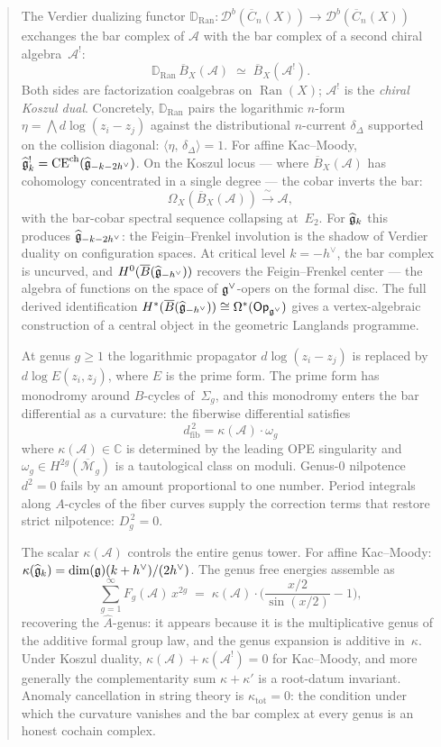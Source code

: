 \documentclass[11pt]{memoir}
\DeclareMathOperator{\Ran}{Ran}
\newcommand{\cat}[1]{\mathsf{#1}}
\newcommand{\Op}{\cat{Op}}
\newcommand{\cA}{\mathcal{A}}
\newcommand{\barB}{\overline{B}}
\newcommand{\dfib}{d_{\mathrm{fib}}}                  %
\newcommand{\Dg}[1]{D_{#1}}                           %
\begin{document}
\begin{abstract}
\medskip
The Verdier dualizing functor
$\mathbb{D}_{\Ran}\colon
\mathcal{D}^b(\overline{C}_n(X)) \to
\mathcal{D}^b(\overline{C}_n(X))$
exchanges the bar complex of $\cA$ with the bar complex of a second
chiral algebra~$\cA^!$:
\[
\mathbb{D}_{\Ran}\,\barB_X(\cA)
\;\simeq\; \barB_X(\cA^!).
\]
Both sides are factorization coalgebras on $\operatorname{Ran}(X)$;
$\cA^!$ is the \emph{chiral Koszul dual}.
Concretely, $\mathbb{D}_{\Ran}$ pairs the logarithmic $n$-form
$\eta = \bigwedge d\log(z_i - z_j)$ against the distributional
$n$-current $\delta_\Delta$ supported on the collision diagonal:
$\langle \eta,\, \delta_\Delta \rangle = 1$.
For affine Kac--Moody, $\widehat{\fg}_k^! =
\mathrm{CE}^{\mathrm{ch}}(\widehat{\fg}_{-k-2h^\vee})$.  On
the Koszul locus --- where $\barB_X(\cA)$ has cohomology concentrated
in a single degree --- the cobar inverts the bar:
\[
\Omega_X(\barB_X(\cA)) \xrightarrow{\;\sim\;} \cA,
\]
with the bar-cobar spectral sequence collapsing at~$E_2$.  For
$\widehat{\fg}_k$ this produces
$\widehat{\fg}_{-k-2h^\vee}$: the Feigin--Frenkel involution is the
shadow of Verdier duality on configuration spaces.  At critical level
$k = -h^\vee$, the bar complex is uncurved, and
$H^0(\barB(\widehat{\fg}_{-h^\vee}))$ recovers the Feigin--Frenkel
center --- the algebra of functions on the space of
$\fg^\vee$-opers on the formal disc.  The full derived identification
$H^*(\barB(\widehat{\fg}_{-h^\vee})) \cong \Omega^*(\Op_{\fg^\vee})$
gives a vertex-algebraic construction of a central object in the
geometric Langlands programme.

\medskip
At genus $g \geq 1$ the logarithmic propagator $d\log(z_i - z_j)$ is
replaced by $d\log E(z_i, z_j)$, where $E$ is the prime form.  The
prime form has monodromy around $B$-cycles of~$\Sigma_g$, and this
monodromy enters the bar differential as a curvature: the fiberwise
differential satisfies
\[
\dfib^{\,2} = \kappa(\cA) \cdot \omega_g
\]
where $\kappa(\cA) \in \mathbb{C}$ is determined by the leading OPE
singularity and $\omega_g \in H^{2g}(\overline{\mathcal{M}}_g)$ is a
tautological class on moduli.  Genus-$0$ nilpotence $d^2 = 0$ fails by
an amount proportional to one number.  Period integrals along $A$-cycles
of the fiber curves supply the correction terms that restore strict
nilpotence:
$\Dg{g}^{\,2} = 0$.

The scalar $\kappa(\cA)$ controls the entire genus tower.
For affine Kac--Moody:
$\kappa(\widehat{\fg}_k) = \dim(\fg)(k + h^\vee)/(2h^\vee)$.
The genus free energies assemble as
\[
\sum_{g=1}^{\infty} F_g(\cA)\, x^{2g}
\;=\; \kappa(\cA) \cdot
\biggl(\frac{x/2}{\sin(x/2)} - 1\biggr),
\]
recovering the $\hat{A}$-genus: it appears because it is the
multiplicative genus of the additive formal group law, and the genus
expansion is additive in~$\kappa$.  Under Koszul duality,
$\kappa(\cA) + \kappa(\cA^!) = 0$
for Kac--Moody, and more generally the complementarity sum
$\kappa + \kappa'$ is a root-datum invariant.  Anomaly cancellation in
string theory is $\kappa_{\mathrm{tot}} = 0$: the condition under
which the curvature vanishes and the bar complex at every genus is an
honest cochain complex.


\end{abstract}
\end{document}
